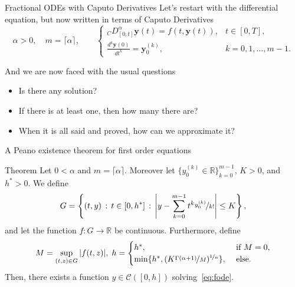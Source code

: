 \documentclass[aspectratio=169,xcolor=dvipsnames]{beamer}
\begin{document}
\begin{frame}{Fractional ODEs with Caputo Derivatives}
Let's restart with the differential equation, but now written in terms of Caputo Derivatives
\begin{equation}\label{eq:fode}
\alpha > 0,\quad m = \lceil \alpha \rceil, \qquad \begin{cases}
\displaystyle {}_{C}{D_{[0,t]}^{\alpha}} \mathbf{y}(t) = f(t,\mathbf{y}(t)), & t \in [0,T],\\[0.5em]
\displaystyle \frac{d^k \mathbf{y}(0)}{d t^k}  = \mathbf{y}_0^{(k)}, & k=0,1,\ldots,m-1.
\end{cases}\tag{FODE}
\end{equation}

And we are now faced with the usual questions
\begin{itemize}
\item[\only<1>{\faQuestionCircle}\only<2>{\textcolor{success}{\faQuestionCircle}}] Is there any solution? 
\item[\only<1>{\faQuestionCircle}\only<2>{\textcolor{success}{\faQuestionCircle}}] If there is at least one, then how many there are?
\item[\only<1>{\faQuestionCircle}\only<2>{\textcolor{todo}{\faQuestionCircle}}]  When it is all said and proved, how can we approximate it?
\end{itemize}
\end{frame}

\begin{frame}{A Peano existence theorem for first order equations}

\begin{alertblock}{Theorem \parencite[Theorem 2.1,2.2]{DiethelmFord}}
Let $0 < \alpha$  and $m = \lceil \alpha \rceil$. Moreover let $\{ y_0^{(k)} \in \mathbb{R} \}_{k=0}^{m-1}$, $K > 0$, and $h^* > 0$. We define
\[
G = \left\lbrace (t,y) \,:\, t \in [0,h^*] \,:\, \left| y - \sum_{k=0}^{m-1} t^k \nicefrac{y_0^{(k)}}{k!} \right| \leq K  \right\rbrace,
\]
and let the function $f: G \rightarrow \mathbb{R}$ be continuous. Furthermore, define
\[
M = \sup_{(t,z) \in G} |f(t,z)|, \; h = \begin{cases}
h^*, & \text{ if }M=0,\\
\min \{ h^*, (K \nicefrac{\Gamma(\alpha+1)}{M})^{\nicefrac{1}{n}} \}, & \text{ else.}
\end{cases}
\]
Then, there exists a function $y \in \mathcal{C}([0,h])$ solving~\eqref{eq:fode}.
\end{alertblock}


\end{frame}
\end{document}
